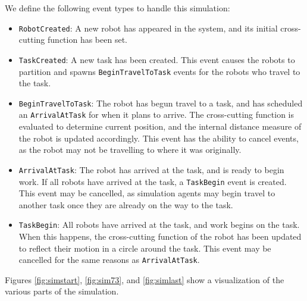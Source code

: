 \documentclass[conference,letterpaper]{IEEEtran}
\begin{document}
We define the following event types to handle this simulation:
\begin{itemize}
    \item \texttt{RobotCreated}: A new robot has appeared in the system, and
        its initial cross-cutting function has been set.
    \item \texttt{TaskCreated}: A new task has been created. This event
        causes the robots to partition and spawns \texttt{BeginTravelToTask}
        events for the robots who travel to the task.
    \item \texttt{BeginTravelToTask}: The robot has begun travel to a task, and
        has scheduled an \texttt{ArrivalAtTask} for when it plans to arrive.
        The cross-cutting function is evaluated to determine current position,
        and the internal distance measure of the robot is updated accordingly.
        This event has the ability to cancel events, as the robot may not be
        travelling to where it was originally.
    \item \texttt{ArrivalAtTask}: The robot has arrived at the task, and is
        ready to begin work. If all robots have arrived at the task, a
        \texttt{TaskBegin} event is created. This event may be cancelled, as
        simulation agents may begin travel to another task once they are
        already on the way to the task.
    \item \texttt{TaskBegin}: All robots have arrived at the task, and work
        begins on the task. When this happens, the cross-cutting function of
        the robot has been updated to reflect their motion in a circle around
        the task. This event may be cancelled for the same reasons as
        \texttt{ArrivalAtTask}.
\end{itemize}

Figures \ref{fig:simstart}, \ref{fig:sim73}, and \ref{fig:simlast} show a
visualization of the various parts of the simulation.
\end{document}
